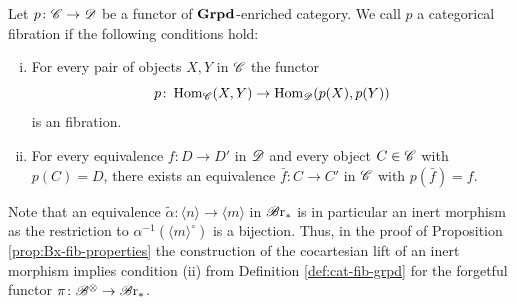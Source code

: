 
\begin{defin}\label{def:cat-fib-grpd} Let $p \colon \mathscr{C} \to \mathscr{D}$ be a functor of
    $\operatorname{\textbf{Grpd}}$-enriched category. We call $p$ a categorical fibration if the
    following conditions hold:
    \begin{enumerate}[(i)]

        \item For every pair of objects $X,Y$ in $\mathscr{C}$ the functor
        \[
            p \colon \operatorname{Hom}_{\mathscr{C}}(X,Y) \to \operatorname{Hom}_{\mathscr{D}}(p(X), p(Y))
        \]
        is an fibration. 
        \item For every equivalence $f \colon D \to D'$ in $\mathscr{D}$ and every object
        $C \in \mathscr{C}$ with $p(C) = D$, there exists an equivalence $\bar{f} \colon
        C \to C'$ in $\mathscr{C}$ with $p(\bar{f}) = f$.
    \end{enumerate}
\end{defin}

\begin{rem}
    Note that an equivalence $\widetilde{\alpha} \colon \langle n \rangle \to
    \langle m \rangle$ in $\mathscr{B} \text{r}_{\ast}$ is in particular an inert morphism as the
    restriction to $\alpha^{-1}(\langle m \rangle^{\circ})$ is a bijection.
    Thus, in the proof of Proposition \ref{prop:Bx-fib-properties} the
    construction of the cocartesian lift of an inert morphism implies condition
    (ii) from Definition \ref{def:cat-fib-grpd} for the forgetful functor $\pi
    \colon \mathscr{B}^{\otimes} \to \mathscr{B} \text{r}_{\ast}$.
\end{rem}

